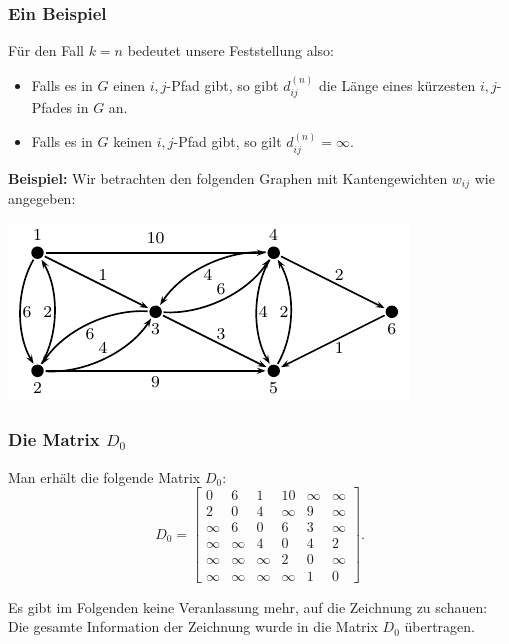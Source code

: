 \documentclass[smaller,xcolor=dvipsnames]{beamer}
\begin{document}
\begin{frame}
\frametitle{Ein Beispiel}
Für den Fall $k=n$ bedeutet unsere Feststellung also:
 \begin{itemize}
\item \alert{Falls es in $G$ einen $i,j$-Pfad gibt, so gibt $d_{ij}^{(n)}$ die Länge eines kürzesten $i,j$-Pfades in $G$ an.}
\item \alert{Falls es in $G$ keinen $i,j$-Pfad gibt, so gilt $d_{ij}^{(n)} = \infty$.}
\end{itemize}

\textbf{Beispiel:} Wir betrachten den folgenden Graphen mit Kantengewichten $w_{ij}$ wie angegeben:

\begin{center}
 \includegraphics{fig103.pdf}
\end{center}
\end{frame}

\begin{frame}
\frametitle{Die Matrix $D_0$}
 Man erhält die folgende Matrix $D_0$:
\[
D_0 =
\begin{bmatrix}
0 & 6 & 1 & 10 & \infty & \infty \\
2 & 0 & 4 & \infty & 9 & \infty \\
\infty & 6 & 0 & 6 & 3 & \infty \\
\infty & \infty & 4 & 0 & 4 & 2 \\
\infty & \infty & \infty & 2 & 0 & \infty \\
\infty & \infty & \infty & \infty & 1 & 0
\end{bmatrix}.
\] \medskip

\alert{Es gibt im Folgenden keine Veranlassung mehr, auf die Zeichnung zu schauen:} Die gesamte Information der Zeichnung wurde in die Matrix $D_0$ übertragen.
\end{frame}
\end{document}
